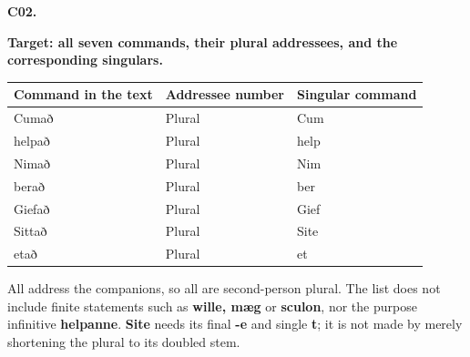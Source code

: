 \par\begin{minipage}{\linewidth}\raggedright
\textbf{C02.}

\textbf{Target: all seven commands, their plural addressees, and the corresponding singulars.}

\par\begingroup
\fontsize{10.5}{13.2}\selectfont
\setlength{\LTleft}{0pt}\setlength{\LTright}{\fill}
\noindent
\begin{tabular}{@{}>{\raggedright\arraybackslash}p{40.6mm}>{\raggedright\arraybackslash}p{39.79mm}>{\raggedright\arraybackslash}p{37.99mm}@{}}
\toprule
\textbf{Command in the text} & \textbf{Addressee number} & \textbf{Singular command} \\
\midrule
Cumað & Plural & Cum \\
helpað & Plural & help \\
Nimað & Plural & Nim \\
berað & Plural & ber \\
Giefað & Plural & Gief \\
Sittað & Plural & Site \\
etað & Plural & et \\
\bottomrule
\end{tabular}
\par\endgroup

All address the companions, so all are second-person plural. The list does not include finite statements such as \textbf{wille, mæg} or \textbf{sculon}, nor the purpose infinitive \textbf{helpanne}. \textbf{Site} needs its final \textbf{-e} and single \textbf{t}; it is not made by merely shortening the plural to its doubled stem.

\end{minipage}\par\addvspace{4pt}

